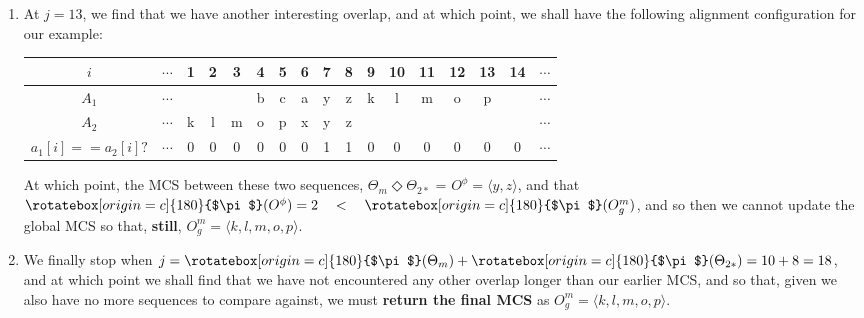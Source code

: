 \documentclass[a4paper, 18pt]{book} %
\newcommand{\invpi}{\rotatebox[origin=c]{180}{$\pi$}}
\begin{document}
\begin{enumerate}
{\begin{adjustwidth}{0em}{}
\begin{tabular}[H]{|c||c|c|c|c|c|c|c|c|c|c|c|c|c|}
\end{tabular}
\end{adjustwidth}
\vspace{1em}

At which point, the MCS between these two sequences, $\Theta_m \Diamond \Theta_{2*}$ = $O^\phi = \langle \rangle$, and that $\invpi(O^\phi) = 0 \quad < \quad \invpi(O^m_g)$, and so then we cannot update the global MCS so that, \textbf{still}, $O^m_g = \langle k, l, m, o, p\rangle$.


}
\item{ At $j =  13$, we find that we have another interesting overlap, and at which point, we shall have the following alignment configuration for our example:

\vspace{1em}
\begin{adjustwidth}{0em}{}
\begin{tabular}[H]{|c||c|c|c|c|c|c|c|c|c|c|c|c|c|c|c|c|}
\hline
$i$ & $\cdots$ & 1 & 2 & 3 & 4 & 5 & 6 & 7 & 8 & 9 & 10 & 11 & 12 & 13 & 14 & $\cdots$ \\
\hline
$A_1$ & $\cdots$ & & & & b & c & a & y & z & k & l & m & o & p & &$\cdots$ \\
\hline
$A_2$ & $\cdots$ & k & l & m & o & p & x & y & z &  &  & & & & &$\cdots$\\
\hline
$a_1[i]==a_2[i]?$ & $\cdots$ & 0& 0 & 0 & 0 & 0 & 0 & 1 & 1 & 0 & 0 & 0 & 0 & 0  &0 & $\cdots$ \\
\hline
 
\end{tabular}
\end{adjustwidth}
\vspace{1em}

At which point, the MCS between these two sequences, $\Theta_m \Diamond \Theta_{2*}$ = $O^\phi = \langle y, z\rangle$, and that $\invpi(O^\phi) = 2 \quad < \quad \invpi(O^m_g)$, and so then we cannot update the global MCS so that, \textbf{still}, $O^m_g = \langle k, l, m, o, p\rangle$.


}
\item We finally stop when $j = \invpi(\Theta_m) + \invpi(\Theta_{2*}) = 10 + 8 = 18$, and at which point we shall find that we have not encountered any other overlap longer than our earlier MCS, and so that, given we also have no more sequences to compare against, we must \textbf{return the final MCS} as $O^m_g = \langle k, l, m, o, p\rangle$.
\end{enumerate}
\end{document}
